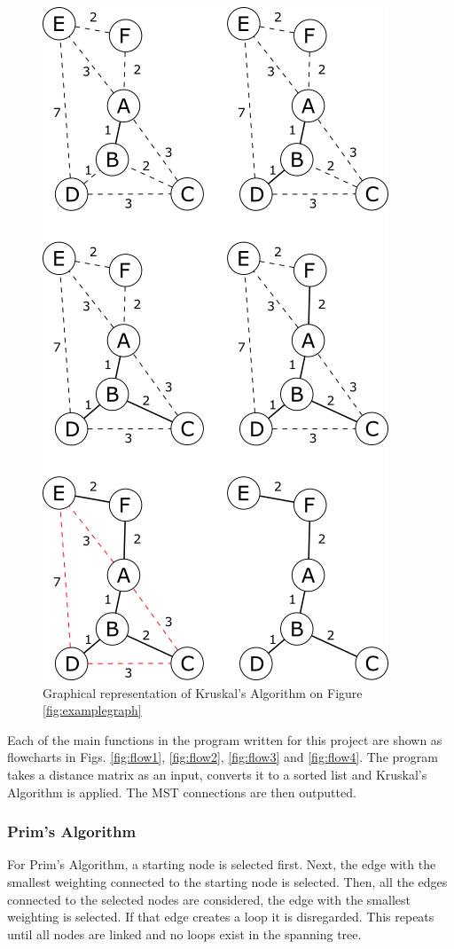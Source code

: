 \documentclass[twocolumn]{article}
\begin{document}
\begin{figure}[H]
\centering
\includegraphics[width=0.75\columnwidth]{Figures/Kruskal Example.png}
\caption{Graphical representation of Kruskal’s Algorithm on Figure \ref{fig:examplegraph}}
\end{figure}


Each of the main functions in the program written for this project are shown as flowcharts in Figs. \ref{fig:flow1}, \ref{fig:flow2}, \ref{fig:flow3} and \ref{fig:flow4}. The program takes a distance matrix as an input, converts it to a sorted list and Kruskal’s Algorithm is applied. The MST connections are then outputted. 


\subsubsection{Prim's Algorithm}
For Prim’s Algorithm, a starting node is selected first. Next, the edge with the smallest weighting connected to the starting node is selected. Then, all the edges connected to the selected nodes are considered, the edge with the smallest weighting is selected. If that edge creates a loop it is disregarded. This repeats until all nodes are linked and no loops exist in the spanning tree.
\end{document}
